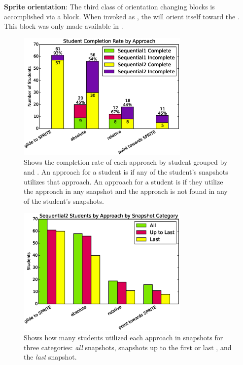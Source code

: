 \textbf{Sprite orientation}: The third class of orientation changing blocks is
accomplished via a \pointtoward{} block. When invoked as
\pointtoward[\zebra{}]{}, the \net{} will orient itself toward the
\zebra{}. This block was only made available in \stwo{}.

\begin{figure}[!t]
\centering
\includegraphics[width=3.3in]{graphs/approach_student_success.eps}
\caption{Shows the completion rate of each approach by student grouped by
  \sone{} and \stwo{}. An approach for a student is \com{} if any of the
  student's \com{} snapshots utilizes that approach. An approach for a student
  is \incom{} if they utilize the approach in any \incom{} snapshot and the
  approach is not found in any of the student's \com{} snapshots.}
\end{figure}

\begin{figure}[!t]
\centering \includegraphics[width=3.3in]{graphs/approach_bar_Sequential2.eps}
\caption{Shows how many students utilized each approach in \stwo{} snapshots
  for three categories: \emph{all} snapshots, snapshots up to the first \com{}
  or last \incom{}, and the \emph{last} snapshot.}
\end{figure}

